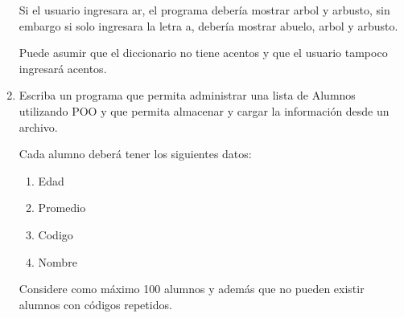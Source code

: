 \documentclass[a4paper]{article}
\begin{document}
\begin{enumerate}
	Si el usuario ingresara ar, el programa debería mostrar arbol
        y arbusto, sin embargo si solo ingresara la letra a, debería
        mostrar abuelo, arbol y arbusto.

	Puede asumir que el diccionario no tiene acentos y que el usuario
        tampoco ingresará acentos.

  \item Escriba un programa que permita administrar una lista de Alumnos
        utilizando POO y que permita almacenar y cargar la información
        desde un archivo.

        Cada alumno deberá tener los siguientes datos:
    \begin{enumerate}
      \item Edad
      \item Promedio
      \item Codigo
      \item Nombre
    \end{enumerate}

        Considere como máximo 100 alumnos y además que no pueden existir
        alumnos con códigos repetidos.

\end{enumerate}
\end{document}
